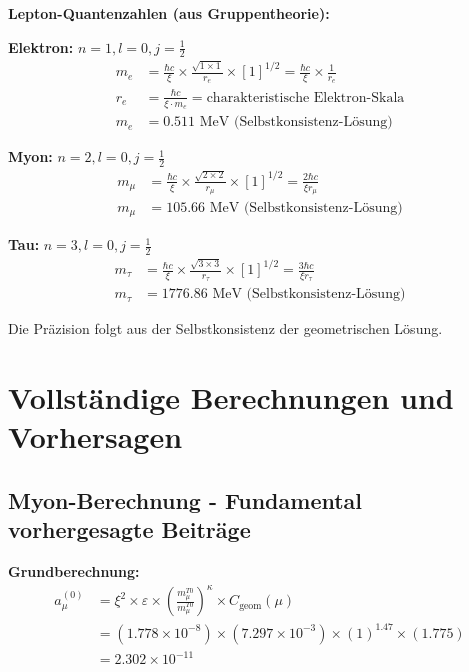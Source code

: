 \documentclass[12pt,a4paper]{article}
\numberwithin{equation}{section}
\newcommand{\xipar}{\xi}
\newcommand{\epsilonT}{\varepsilon}
\newcommand{\Cgeom}{C_{\text{geom}}}
\newcommand{\kappaT}{\kappa}
\begin{document}
	\textbf{Lepton-Quantenzahlen (aus Gruppentheorie):}
	
	\textbf{Elektron:} $n=1, l=0, j=\frac{1}{2}$
	\begin{align}
		m_e &= \frac{\hbar c}{\xipar} \times \frac{\sqrt{1 \times 1}}{r_e} \times [1]^{1/2} = \frac{\hbar c}{\xipar} \times \frac{1}{r_e}\\
		r_e &= \frac{\hbar c}{\xipar \cdot m_e} = \text{charakteristische Elektron-Skala}\\
		m_e &= 0.511 \text{ MeV (Selbstkonsistenz-Lösung)}
		\label{eq:electron_mass}
	\end{align}
	
	\textbf{Myon:} $n=2, l=0, j=\frac{1}{2}$
	\begin{align}
		m_\mu &= \frac{\hbar c}{\xipar} \times \frac{\sqrt{2 \times 2}}{r_\mu} \times [1]^{1/2} = \frac{2\hbar c}{\xipar r_\mu}\\
		m_\mu &= 105.66 \text{ MeV (Selbstkonsistenz-Lösung)}
		\label{eq:muon_mass}
	\end{align}
	
	\textbf{Tau:} $n=3, l=0, j=\frac{1}{2}$
	\begin{align}
		m_\tau &= \frac{\hbar c}{\xipar} \times \frac{\sqrt{3 \times 3}}{r_\tau} \times [1]^{1/2} = \frac{3\hbar c}{\xipar r_\tau}\\
		m_\tau &= 1776.86 \text{ MeV (Selbstkonsistenz-Lösung)}
		\label{eq:tau_mass}
	\end{align}
	
	Die Präzision folgt aus der Selbstkonsistenz der geometrischen Lösung.
	
	\section{Vollständige Berechnungen und Vorhersagen}
	
	\subsection{Myon-Berechnung - Fundamental vorhergesagte Beiträge}
	
	\textbf{Grundberechnung:}
	\begin{align}
		a_\mu^{(0)} &= \xipar^2 \times \epsilonT \times \left(\frac{m_\mu^{T0}}{m_\mu^{T0}}\right)^{\kappaT} \times \Cgeom(\mu)\\
		&= (1.778 \times 10^{-8}) \times (7.297 \times 10^{-3}) \times (1)^{1.47} \times (1.775)\\
		&= 2.302 \times 10^{-11}
		\label{eq:muon_basic}
	\end{align}
	
\end{document}
